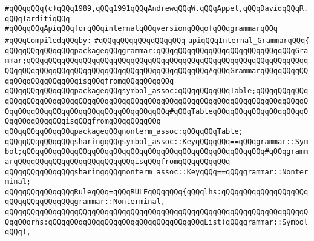 \label{src/app/yacc/src/internal-grammar.api}
\verb|#qQQqqQQq(c)qQQq1989,qQQq1991qQQqAndrewqQQqW.qQQqAppel,qQQqDavidqQQqR.qQQqTarditiqQQq|\newline
\verb|#qQQqqQQqApiqQQqforqQQqinternalqQQqversionqQQqofqQQqgrammarqQQq|\newline
\newline
\verb|#qQQqCompiledqQQqby:|\newline
\verb|#qQQqqQQqqQQqqQQqqQQq|\newline
\newline
\newline
\newline
\verb|apiqQQqInternal_GrammarqQQq{|\newline
\newline
\verb|qQQqqQQqqQQqqQQqpackageqQQqgrammar:qQQqqQQqqQQqqQQqqQQqqQQqqQQqqQQqGrammar;qQQqqQQqqQQqqQQqqQQqqQQqqQQqqQQqqQQqqQQqqQQqqQQqqQQqqQQqqQQqqQQqqQQqqQQqqQQqqQQqqQQqqQQqqQQqqQQqqQQqqQQqqQQqqQQq#qQQqGrammarqQQqqQQqqQQqqQQqqQQqqQQqqQQqisqQQqfromqQQqqQQqqQQq|\newline
\verb|qQQqqQQqqQQqqQQqpackageqQQqsymbol_assoc:qQQqqQQqqQQqTable;qQQqqQQqqQQqqQQqqQQqqQQqqQQqqQQqqQQqqQQqqQQqqQQqqQQqqQQqqQQqqQQqqQQqqQQqqQQqqQQqqQQqqQQqqQQqqQQqqQQqqQQqqQQqqQQqqQQqqQQq#qQQqTableqQQqqQQqqQQqqQQqqQQqqQQqqQQqqQQqqQQqisqQQqfromqQQqqQQqqQQq|\newline
\verb|qQQqqQQqqQQqqQQqpackageqQQqnonterm_assoc:qQQqqQQqTable;|\newline
\newline
\verb|qQQqqQQqqQQqqQQqsharingqQQqsymbol_assoc::KeyqQQqqQQq==qQQqgrammar::Symbol;qQQqqQQqqQQqqQQqqQQqqQQqqQQqqQQqqQQqqQQqqQQqqQQqqQQqqQQq#qQQqgrammarqQQqqQQqqQQqqQQqqQQqqQQqqQQqisqQQqfromqQQqqQQqqQQq|\newline
\verb|qQQqqQQqqQQqqQQqsharingqQQqnonterm_assoc::KeyqQQq==qQQqgrammar::Nonterminal;|\newline
\newline
\verb|qQQqqQQqqQQqqQQqRuleqQQq=qQQqRULEqQQqqQQq{qQQqlhs:qQQqqQQqqQQqqQQqqQQqqQQqqQQqqQQqqQQqgrammar::Nonterminal,|\newline
\verb|qQQqqQQqqQQqqQQqqQQqqQQqqQQqqQQqqQQqqQQqqQQqqQQqqQQqqQQqqQQqqQQqqQQqqQQqqQQqrhs:qQQqqQQqqQQqqQQqqQQqqQQqqQQqqQQqqQQqList(qQQqgrammar::SymbolqQQq),|\newline
